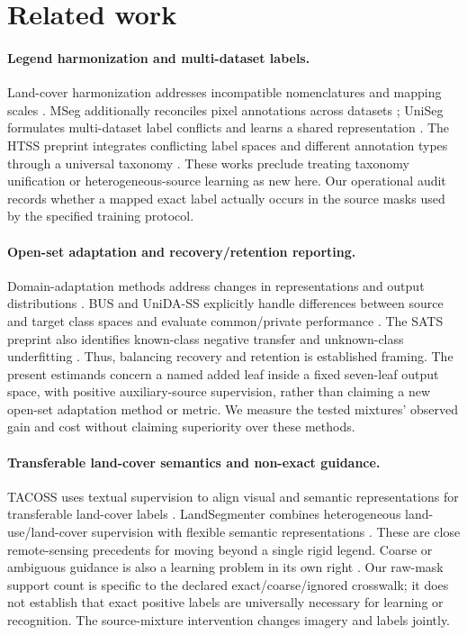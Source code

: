 \section{Related work}
\label{sec:related_work}
\paragraph{Legend harmonization and multi-dataset labels.}
Land-cover harmonization addresses incompatible nomenclatures and mapping scales \citep{yang2017harmonization,baudoux2021translation}. MSeg additionally reconciles pixel annotations across datasets \citep{lambert2020mseg}; UniSeg formulates multi-dataset label conflicts and learns a shared representation \citep{kim2022uniseg}. The HTSS preprint integrates conflicting label spaces and different annotation types through a universal taxonomy \citep{meletis2023htss}. These works preclude treating taxonomy unification or heterogeneous-source learning as new here. Our operational audit records whether a mapped exact label actually occurs in the source masks used by the specified training protocol.

\paragraph{Open-set adaptation and recovery/retention reporting.}
Domain-adaptation methods address changes in representations and output distributions \citep{ganin2016dann,hoffman2018cycada,vu2019advent,zou2018classbalanced}. BUS and UniDA-SS explicitly handle differences between source and target class spaces and evaluate common/private performance \citep{choe2024bus,choe2025unida}. The SATS preprint also identifies known-class negative transfer and unknown-class underfitting \citep{ren2026sats}. Thus, balancing recovery and retention is established framing. The present estimands concern a named added leaf inside a fixed seven-leaf output space, with positive auxiliary-source supervision, rather than claiming a new open-set adaptation method or metric. We measure the tested mixtures' observed gain and cost without claiming superiority over these methods.

\paragraph{Transferable land-cover semantics and non-exact guidance.}
TACOSS uses textual supervision to align visual and semantic representations for transferable land-cover labels \citep{zermatten2025tacoss}. LandSegmenter combines heterogeneous land-use/land-cover supervision with flexible semantic representations \citep{liu2026landsegmenter}. These are close remote-sensing precedents for moving beyond a single rigid legend. Coarse or ambiguous guidance is also a learning problem in its own right \citep{li2024exactguidance,cour2011partial}. Our raw-mask support count is specific to the declared exact/coarse/ignored crosswalk; it does not establish that exact positive labels are universally necessary for learning or recognition. The source-mixture intervention changes imagery and labels jointly.



